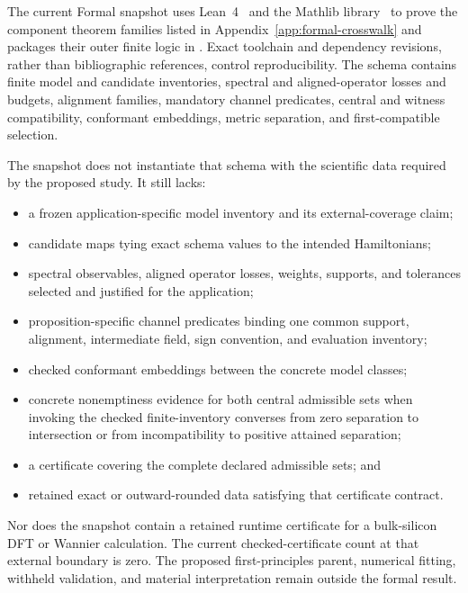The current Formal snapshot uses Lean~4~\cite{DeMouraUllrich2021} and the Mathlib
library~\cite{MathlibCommunity2020} to prove the component theorem families listed in
Appendix~\ref{app:formal-crosswalk} and packages their outer finite logic in
. Exact toolchain and dependency revisions, rather than
bibliographic references, control reproducibility. The schema contains finite model and candidate
inventories, spectral and aligned-operator losses and budgets, alignment families,
mandatory channel predicates, central and witness compatibility, conformant embeddings,
metric separation, and first-compatible selection.

The snapshot does not instantiate that schema with the scientific data required by the
proposed study.  It still lacks:

\begin{itemize}
  \item a frozen application-specific model inventory and its external-coverage claim;
  \item candidate maps tying exact schema values to the intended Hamiltonians;
  \item spectral observables, aligned operator losses, weights, supports, and tolerances
        selected and justified for the application;
  \item proposition-specific channel predicates binding one common support, alignment,
        intermediate field, sign convention, and evaluation inventory;
  \item checked conformant embeddings between the concrete model classes;
  \item concrete nonemptiness evidence for both central admissible sets when invoking
        the checked finite-inventory converses from zero separation to intersection or
        from incompatibility to positive attained separation;
  \item a certificate covering the complete declared admissible sets; and
  \item retained exact or outward-rounded data satisfying that certificate contract.
\end{itemize}

Nor does the snapshot contain a retained runtime certificate for a bulk-silicon DFT or
Wannier calculation.  The current checked-certificate count at that external boundary
is zero.  The proposed first-principles parent, numerical fitting, withheld validation,
and material interpretation remain outside the formal result.

